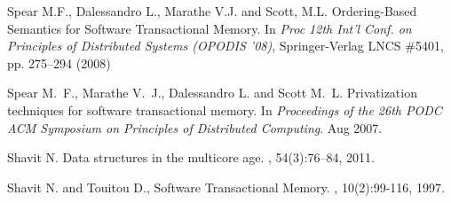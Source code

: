 \begin{thebibliography}{99}
{
Spear M.F.,  Dalessandro L.,  Marathe V.J. and  Scott, M.L.
\newblock Ordering-Based Semantics for Software Transactional Memory. 
\newblock In {\it Proc  12th Int'l Conf. on Principles of Distributed Systems 
(OPODIS '08)},  Springer-Verlag LNCS \#5401, pp. 275--294 (2008) 



Spear M.~F., Marathe V.~J., Dalessandro L. and Scott M.~L.
\newblock Privatization techniques for software transactional memory.
\newblock In {\em Proceedings of the 26th PODC ACM Symposium on Principles of
  Distributed Computing}. Aug 2007.








Shavit N.
\newblock Data structures in the multicore age.
, 54(3):76--84, 2011.

% 



Shavit N. and Touitou D., 
\newblock Software Transactional Memory. 
, 10(2):99-116, 1997. 


% 
% 
% 
% 
% 



}
\end{thebibliography}
